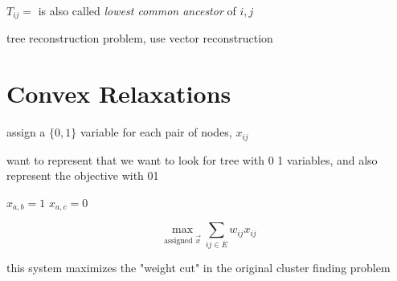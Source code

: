 \documentclass{article}
\theoremstyle{definition}
\begin{document}
\(T_{ij}=\) is also called \emph{lowest common ancestor} of \(i,j\)


tree reconstruction problem, use vector reconstruction

\section{Convex Relaxations}
assign a \(\{0,1\}\) variable for each pair of nodes, \(x_{ij}\)

want to represent that we want to look for tree with 0 1 variables, and also represent the objective with 01




\(x_{a,b} = 1 \)
\(x_{a,c} = 0 \)

\begin{equation}
    \max_{\text{assigned $\vec x$}}\sum_{ij\in E} w_{ij}x_{ij}
\end{equation}

this system maximizes the "weight cut" in the original cluster finding problem
\end{document}
